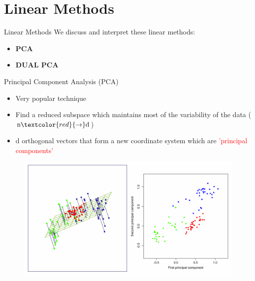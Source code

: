 \documentclass[10pt]{beamer}
\begin{document}
\section{Linear Methods}
\begin{frame}{Linear Methods}
	We discuss and interpret these linear methods: 
	\begin{itemize}
		\item \textbf{PCA}
		\item \textbf{DUAL PCA} 
		
	\end{itemize}
	
\end{frame}


\begin{frame}{Principal Component Analysis (PCA)}
\begin{itemize}
		\item Very popular technique
        \item Find a reduced subspace which  maintains most of the variability of the data ($\hbox{n} \textcolor{red}{\rightarrow} \hbox{d}$) 
        
        \item  d orthogonal vectors that form a new coordinate system which are \textcolor{red}{'principal components'}
	\end{itemize}

\begin{figure}[h]
    \includegraphics[scale=.4]{pca.png}
    \end{figure}
    
\end{frame} 
\end{document}
